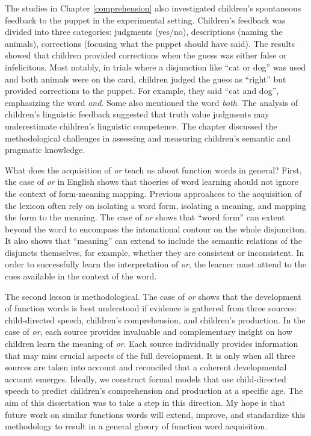 \documentclass[oneside]{report}
\theoremstyle{definition}
\theoremstyle{definition}
\theoremstyle{definition}
\theoremstyle{remark}
\begin{document}
The studies in Chapter \ref{comprehension} also investigated children's
spontaneous feedback to the puppet in the experimental setting.
Children's feedback was divided into three categories: judgments
(yes/no), descriptions (naming the animals), corrections (focusing what
the puppet should have said). The results showed that children provided
corrections when the guess was either false or infelicitous. Most
notably, in trials where a disjunction like ``cat or dog'' was used and
both animals were on the card, children judged the guess as ``right''
but provided corrections to the puppet. For example, they said ``cat and
dog'', emphasizing the word \emph{and}. Some also mentioned the word
\emph{both}. The analysis of children's linguistic feedback suggested
that truth value judgments may underestimate children's linguistic
competence. The chapter discussed the methodological challenges in
assessing and measuring children's semantic and pragmatic knowledge.

What does the acquisition of \emph{or} teach us about function words in
general? First, the case of \emph{or} in English shows that thoeries of
word learning should not ignore the context of form-meaning mapping.
Previous approahces to the acquisition of the lexicon often rely on
isolating a word form, isolating a meaning, and mapping the form to the
meaning. The case of \emph{or} shows that ``word form'' can extent
beyond the word to encompass the intonational contour on the whole
disjunciton. It also shows that ``meaning'' can extend to include the
semantic relations of the disjuncts themselves, for example, whether
they are consistent or inconsistent. In order to successfully learn the
interpretation of \emph{or}, the learner must attend to the cues
available in the context of the word.

The second lesson is methodological. The case of \emph{or} shows that
the development of function words is best understood if evidence is
gathered from three sources: child-directed speech, children's
comprehension, and children's production. In the case of \emph{or}, each
source provides invaluable and complementary insight on how children
learn the meaning of \emph{or}. Each source individually provides
information that may miss crucial aspects of the full development. It is
only when all three sources are taken into account and reconciled that a
coherent developmental account emerges. Ideally, we construct formal
models that use child-directed speech to predict children's
comprehension and production at a specific age. The aim of this
dissertation was to take a step in this direction. My hope is that
future work on similar functions words will extend, improve, and
standardize this methodology to result in a general gheory of function
word acquisition.
\end{document}
